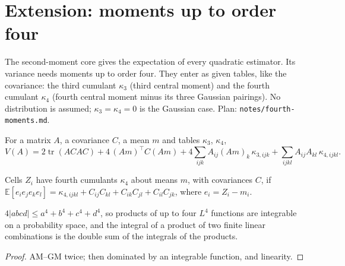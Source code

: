 \chapter{Extension: moments up to order four}\label{ch:cumulants}

The second-moment core gives the expectation of every quadratic estimator. Its variance
needs moments up to order four. They enter as given tables, like the covariance: the third
cumulant $\kappa_3$ (third central moment) and the fourth cumulant $\kappa_4$ (fourth central
moment minus its three Gaussian pairings). No distribution is assumed; $\kappa_3 = \kappa_4 = 0$
is the Gaussian case. Plan: \texttt{notes/fourth-moments.md}.

\begin{definition}\label{def:varQuad}
  \leanok
  For a matrix $A$, a covariance $C$, a mean $m$ and tables $\kappa_3$, $\kappa_4$,
  \[ V(A) = 2\operatorname{tr}(ACAC) + 4\,(Am)^\top C (Am)
     + 4\sum_{ijk} A_{ij}(Am)_k\,\kappa_{3,ijk} + \sum_{ijkl} A_{ij}A_{kl}\,\kappa_{4,ijkl}. \]
\end{definition}

\begin{definition}\label{def:hasFourthCumulant}
  \leanok
  Cells $Z_i$ have fourth cumulants $\kappa_4$ about means $m$, with covariances $C$, if
  $\mathbb E[e_ie_je_ke_l] = \kappa_{4,ijkl} + C_{ij}C_{kl} + C_{ik}C_{jl} + C_{il}C_{jk}$,
  where $e_i = Z_i - m_i$.
\end{definition}

\begin{lemma}\label{lem:cumulants_integrable}
  \leanok
  $4|abcd| \le a^4 + b^4 + c^4 + d^4$, so products of up to four $L^4$ functions are integrable on
  a probability space, and the integral of a product of two finite linear combinations is the
  double sum of the integrals of the products.
\end{lemma}
\begin{proof}
  \leanok
  AM--GM twice; then dominated by an integrable function, and linearity.
\end{proof}

